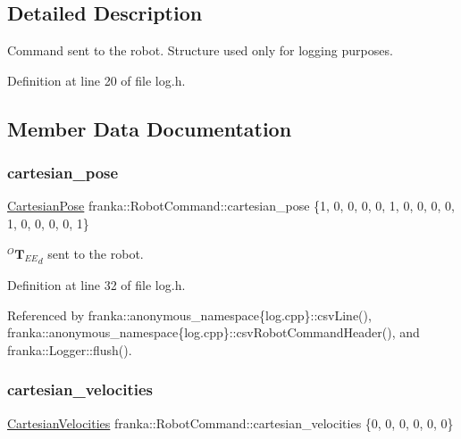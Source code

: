 \subsection{Detailed Description}
Command sent to the robot. Structure used only for logging purposes. 

Definition at line 20 of file log.\+h.



\subsection{Member Data Documentation}
\mbox{\label{structfranka_1_1RobotCommand_acce2090d696ebb9759fd0f37fd35a298}} 
\subsubsection{\texorpdfstring{cartesian\+\_\+pose}{cartesian\_pose}}
{\footnotesize\ttfamily \hyperlink{classfranka_1_1CartesianPose}{Cartesian\+Pose} franka\+::\+Robot\+Command\+::cartesian\+\_\+pose \{1, 0, 0, 0, 0, 1, 0, 0, 0, 0, 1, 0, 0, 0, 0, 1\}}

$^O{\mathbf{T}_{EE}}_{d}$ sent to the robot. 

Definition at line 32 of file log.\+h.



Referenced by franka\+::anonymous\+\_\+namespace\{log.\+cpp\}\+::csv\+Line(), franka\+::anonymous\+\_\+namespace\{log.\+cpp\}\+::csv\+Robot\+Command\+Header(), and franka\+::\+Logger\+::flush().

\mbox{\label{structfranka_1_1RobotCommand_a04b4841130fab920936190be1bc5dba3}} 
\subsubsection{\texorpdfstring{cartesian\+\_\+velocities}{cartesian\_velocities}}
{\footnotesize\ttfamily \hyperlink{classfranka_1_1CartesianVelocities}{Cartesian\+Velocities} franka\+::\+Robot\+Command\+::cartesian\+\_\+velocities \{0, 0, 0, 0, 0, 0\}}

